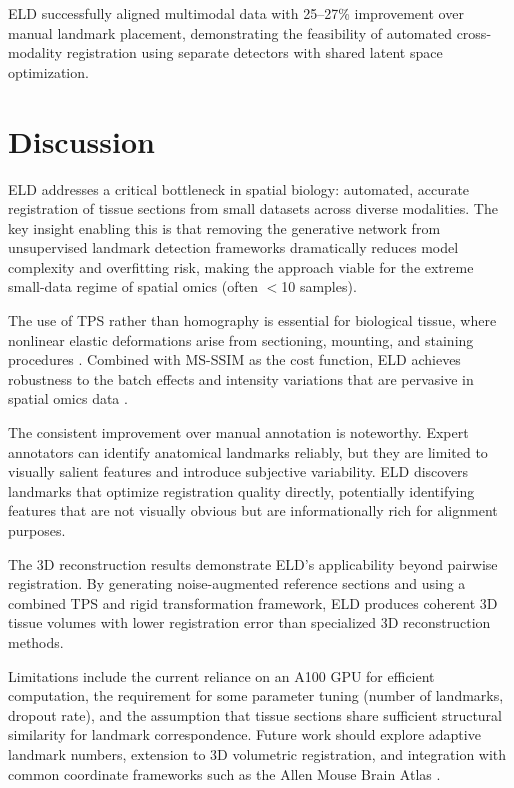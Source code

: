 \documentclass[11pt]{article}
\begin{document}
ELD successfully aligned multimodal data with 25--27\% improvement over manual landmark placement, demonstrating the feasibility of automated cross-modality registration using separate detectors with shared latent space optimization.

\section{Discussion}

ELD addresses a critical bottleneck in spatial biology: automated, accurate registration of tissue sections from small datasets across diverse modalities. The key insight enabling this is that removing the generative network from unsupervised landmark detection frameworks dramatically reduces model complexity and overfitting risk, making the approach viable for the extreme small-data regime of spatial omics (often $<$10 samples).

The use of TPS rather than homography is essential for biological tissue, where nonlinear elastic deformations arise from sectioning, mounting, and staining procedures \citep{tps_bookstein1989, image_registration_review2013}. Combined with MS-SSIM as the cost function, ELD achieves robustness to the batch effects and intensity variations that are pervasive in spatial omics data \citep{batch_effects2018}.

The consistent improvement over manual annotation is noteworthy. Expert annotators can identify anatomical landmarks reliably, but they are limited to visually salient features and introduce subjective variability. ELD discovers landmarks that optimize registration quality directly, potentially identifying features that are not visually obvious but are informationally rich for alignment purposes.

The 3D reconstruction results demonstrate ELD's applicability beyond pairwise registration. By generating noise-augmented reference sections and using a combined TPS and rigid transformation framework, ELD produces coherent 3D tissue volumes with lower registration error than specialized 3D reconstruction methods.

Limitations include the current reliance on an A100 GPU for efficient computation, the requirement for some parameter tuning (number of landmarks, dropout rate), and the assumption that tissue sections share sufficient structural similarity for landmark correspondence. Future work should explore adaptive landmark numbers, extension to 3D volumetric registration, and integration with common coordinate frameworks such as the Allen Mouse Brain Atlas \citep{ccf_allen2020}.
\end{document}
